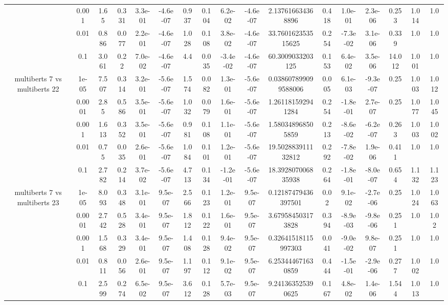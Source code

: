 \begin{tabular}{|c|c|c|c|c|c|c|c|c|c|c|c|c|c|c|c|c|}
 & 0.001 & 1.65 & 0.331 & 3.3e-01 & -4.6e-07 & 0.937 & 0.104 & 6.2e-02 & -4.6e-07 & 2.137616634368896 & 0.418 & 1.0e-01 & 2.3e-06 & 0.253 & 1.014 & 1.0 \\
 & 0.01 & 0.886 & 0.077 & 2.2e-01 & -4.6e-07 & 1.028 & 0.108 & 3.8e-02 & -4.6e-07 & 33.760162353515625 & 0.254 & -7.3e-02 & 3.1e-06 & 0.339 & 1.0 & 1.0 \\
 & 0.1 & 3.061 & 0.22 & 7.0e-02 & -4.6e-07 & 4.4 & 0.035 & -3.4e-02 & -4.6e-07 & 60.3009033203125 & 0.153 & 6.4e-02 & 3.5e-06 & 14.012 & 1.001 & 1.0 \\
\hline
\multirow{5}{*}{multiberts 7 vs multiberts 22} & 1e-05 & 7.507 & 0.314 & 3.2e-01 & -5.6e-07 & 1.574 & 0.082 & 1.3e-01 & -5.6e-07 & 0.038607899099588006 & 0.005 & 6.1e-03 & -9.3e-07 & 0.25 & 1.003 & 1.012 \\
 & 0.0001 & 2.85 & 0.586 & 3.5e-01 & -5.6e-07 & 1.032 & 0.079 & 1.6e-01 & -5.6e-07 & 1.261181592941284 & 0.254 & -1.8e-01 & 2.7e-07 & 0.25 & 1.077 & 1.045 \\
 & 0.001 & 1.613 & 0.352 & 3.5e-01 & -5.6e-07 & 0.981 & 0.108 & 1.1e-01 & -5.6e-07 & 1.580348968505859 & 0.213 & -8.6e-02 & -6.2e-07 & 0.263 & 1.003 & 1.002 \\
 & 0.01 & 0.75 & 0.035 & 2.6e-01 & -5.6e-07 & 1.084 & 0.101 & 1.2e-01 & -5.6e-07 & 19.502883911132812 & 0.292 & -7.8e-02 & 1.9e-06 & 0.411 & 1.0 & 1.0 \\
 & 0.1 & 2.782 & 0.214 & 3.7e-02 & -5.6e-07 & 4.713 & 0.134 & -1.2e-01 & -5.6e-07 & 18.392807006835938 & 0.264 & -1.8e-01 & -8.0e-07 & 0.654 & 1.132 & 1.123 \\
\hline
\multirow{5}{*}{multiberts 7 vs multiberts 23} & 1e-05 & 8.093 & 0.348 & 3.1e-01 & 9.5e-07 & 2.566 & 0.123 & 1.2e-01 & 9.5e-07 & 0.12187479436397501 & 0.02 & 9.1e-02 & -2.7e-06 & 0.25 & 1.024 & 1.063 \\
 & 0.0001 & 2.742 & 0.528 & 3.4e-01 & 9.5e-07 & 1.812 & 0.122 & 1.6e-01 & 9.5e-07 & 3.679584503173828 & 0.394 & -8.9e-03 & -9.8e-06 & 0.251 & 1.0 & 1.02 \\
 & 0.001 & 1.568 & 0.329 & 3.4e-01 & 9.5e-07 & 1.408 & 0.128 & 9.4e-02 & 9.5e-07 & 0.32641518115997303 & 0.041 & -9.0e-02 & 9.8e-07 & 0.251 & 1.0 & 1.0 \\
 & 0.01 & 0.811 & 0.056 & 2.6e-01 & 9.5e-07 & 1.197 & 0.112 & 9.1e-02 & 9.5e-07 & 6.253444671630859 & 0.444 & -1.5e-01 & -2.9e-06 & 0.277 & 1.002 & 1.0 \\
 & 0.1 & 2.599 & 0.274 & 6.5e-02 & 9.5e-07 & 3.612 & 0.128 & 5.7e-03 & 9.5e-07 & 9.241363525390625 & 0.167 & 4.8e-02 & 1.4e-06 & 1.544 & 1.013 & 1.0 \\

\end{tabular}
